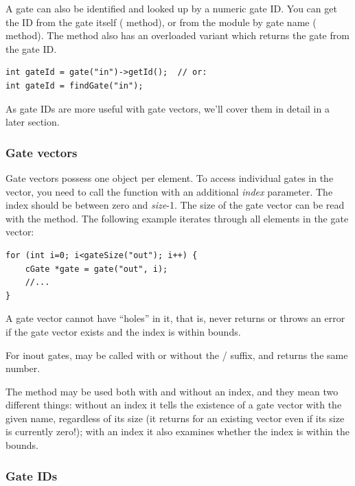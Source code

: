A gate can also be identified and looked up by a numeric gate ID.
You can get the ID from the gate itself ( method),
or from the module by gate name ( method).
The  method also has an overloaded variant which
returns the gate from the gate ID.

\begin{verbatim}
int gateId = gate("in")->getId();  // or:
int gateId = findGate("in");
\end{verbatim}

As gate IDs are more useful with gate vectors, we'll cover them
in detail in a later section.


\subsubsection{Gate vectors}

Gate vectors possess one  object per element.
To access individual gates in the vector, you need to call
the  function with an additional \textit{index}
parameter. The index should be between zero and \textit{size}-1.
The size of the gate vector can be read with the 
method. The following example iterates through all elements in the
gate vector:

\begin{verbatim}
for (int i=0; i<gateSize("out"); i++) {
    cGate *gate = gate("out", i);
    //...
}
\end{verbatim}

A gate vector cannot have ``holes'' in it, that is, 
never returns  or throws an error if the gate vector exists
and the index is within bounds.

For inout gates,  may be called with or without
the / suffix, and returns the same number.

The  method may be used both with and without an
index, and they mean two different things: without an index it tells
the existence of a gate vector with the given name, regardless of its
size (it returns  for an existing vector even if its size
is currently zero!); with an index it also examines whether the index
is within the bounds.


\subsubsection{Gate IDs}


